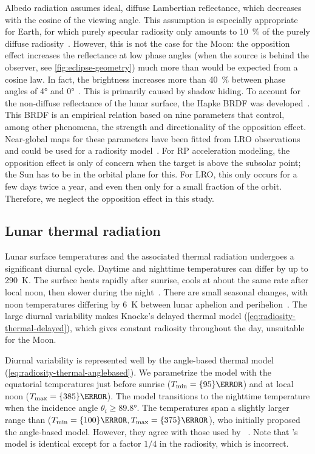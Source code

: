 Albedo radiation assumes ideal, diffuse Lambertian reflectance, which decreases with the cosine of the viewing angle. This assumption is especially appropriate for Earth, for which purely specular radiosity only amounts to \qty{10}{\percent} of the purely diffuse radiosity~\cite{Knocke1988}. However, this is not the case for the Moon: the opposition effect increases the reflectance at low phase angles (when the source is behind the observer, see \cref{fig:eclipse-geometry}) much more than would be expected from a cosine law. In fact, the brightness increases more than \qty{40}{\percent} between phase angles of \ang{4} and \ang{0}~\cite{Buratti1996}. This is primarily caused by shadow hiding. To account for the non-diffuse reflectance of the lunar surface, the Hapke \gls{BRDF} was developed~\cite{Hapke2012}. This \gls{BRDF} is an empirical relation based on nine parameters that control, among other phenomena, the strength and directionality of the opposition effect. Near-global maps for these parameters have been fitted from \gls{LRO} observations and could be used for a radiosity model~\cite{Sato2014}. For \gls{RP} acceleration modeling, the opposition effect is only of concern when the target is above the subsolar point; the Sun has to be in the orbital plane for this. For \gls{LRO}, this only occurs for a few days twice a year, and even then only for a small fraction of the orbit. Therefore, we neglect the opposition effect in this study.




\subsection{Lunar thermal radiation}

Lunar surface temperatures and the associated thermal radiation undergoes a significant diurnal cycle. Daytime and nighttime temperatures can differ by up to \qty{290}{\K}. The surface heats rapidly after sunrise, cools at about the same rate after local noon, then slower during the night~\cite{Vasavada2012}. There are small seasonal changes, with noon temperatures differing by \qty{6}{\K} between lunar aphelion and perihelion~\cite{Heiken1991}. The large diurnal variability makes Knocke's delayed thermal model (\cref{eq:radiosity-thermal-delayed}), which gives constant radiosity throughout the day, unsuitable for the Moon.

Diurnal variability is represented well by the angle-based thermal model (\cref{eq:radiosity-thermal-anglebased}). We parametrize the model with the equatorial temperatures just before sunrise ($T_\textnormal{min} = \qty{95}{\K}$) and at local noon ($T_\textnormal{max} = \qty{385}{\K}$). The model transitions to the nighttime temperature when the incidence angle $\theta_i \geq \ang{89.8}$. The temperatures span a slightly larger range than \citeauthor{Lemoine2013} ($T_\textnormal{min} = \qty{100}{\K}, T_\textnormal{max} = \qty{375}{\K}$), who initially proposed the angle-based model. However, they agree with those used by \citeauthor{Park2011}~\cite{Park2011}. Note that \citeauthor{Park2011}'s model is identical except for a factor $1/4$ in the radiosity, which is incorrect.

